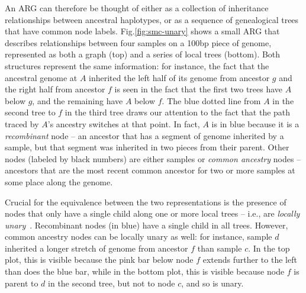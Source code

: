 \documentclass{article}
\begin{document}
An ARG can therefore be thought of either as a collection of inheritance
relationships between ancestral haplotypes,
or as a sequence of genealogical trees that have common node labels.
Fig.\ref{fig:smc-unary} shows a small ARG
that describes relationships between four samples on a 100bp piece of genome,
represented as both a graph (top) and a series of local trees (bottom).
Both structures represent the same information:
for instance, the fact that the ancestral genome at $A$
inherited the left half of its genome from ancestor $g$
and the right half from ancestor $f$
is seen in the fact that the first two trees have $A$ below $g$,
and the remaining have $A$ below $f$.
The blue dotted line from $A$ in the second tree to $f$ in the third tree
draws our attention to the fact that
the path traced by $A$'s ancestry switches at that point.
In fact, $A$ is in blue because it is a \emph{recombinant} node --
an ancestor that has a segment of genome inherited by a sample,
but that segment was inherited in two pieces from their parent.
Other nodes (labeled by black numbers) are either samples
or \emph{common ancestry} nodes --
ancestors that are the most recent common ancestor for two 
or more samples
at some place along the genome.

Crucial for the equivalence between the two representations is the presence of
nodes that only have a single child along one or more local trees --
i.e., are \emph{locally unary}~\citep{wong_general_2023}.
Recombinant nodes (in blue) have a single child in all trees.
However, common ancestry nodes can be locally unary as well:
for instance, sample $d$ inherited a longer stretch of genome from ancestor $f$
than sample $c$.
In the top plot, this is visible because the pink bar below node $f$
extends further to the left than does the blue bar,
while in the bottom plot, this is visible because node $f$ is parent to $d$
in the second tree, but not to node $c$, and so is unary.
\end{document}
